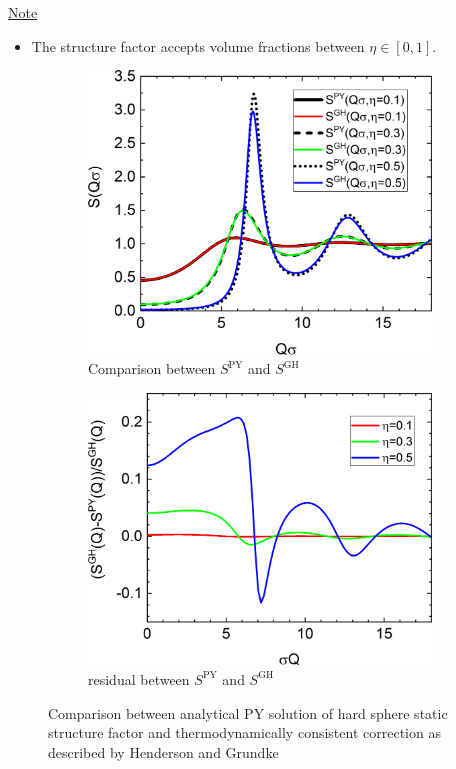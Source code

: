 \noindent
\underline{Note}
\begin{itemize}
\item The structure factor accepts volume fractions between $\eta \in [0,1]$.
\end{itemize}

\begin{figure}[htb]
\begin{subfigure}[b]{.48\textwidth}
   \centering
   \includegraphics[width=1\textwidth]{../images/structure_factor/HardSphere/SQGH.png}
   \caption{Comparison between $S^\mathrm{PY}$ and $S^\mathrm{GH}$}
   \label{fig:SQ:GH_1}
\end{subfigure}
\hfill
\begin{subfigure}[b]{.48\textwidth}
   \centering
   \includegraphics[width=1\textwidth]{../images/structure_factor/HardSphere/ResGH.png}
   \caption{residual between $S^\mathrm{PY}$ and $S^\mathrm{GH}$}
   \label{fig:SQ:GH_2}
\end{subfigure}
\caption{Comparison between analytical PY solution of hard sphere static structure factor and thermodynamically consistent correction as described by Henderson and Grundke}
\label{fig:SQ:GH}
\end{figure}

